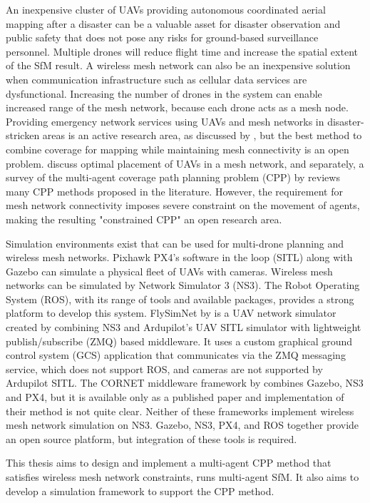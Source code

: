 An inexpensive cluster of UAVs providing autonomous coordinated aerial mapping after a disaster can be a valuable asset for disaster observation and public safety that does not pose any risks for ground-based surveillance personnel. Multiple drones will reduce flight time and increase the spatial extent of the SfM result. A wireless mesh network can also be an inexpensive solution when communication infrastructure such as cellular data services are dysfunctional. Increasing the number of drones in the system can enable increased range of the mesh network, because each drone acts as a mesh node. Providing emergency network services using UAVs and mesh networks in disaster-stricken areas is an active research area, as discussed by , but the best method to combine coverage for mapping while maintaining mesh connectivity is an open problem.  discuss optimal placement of UAVs in a mesh network, and separately, a survey of the multi-agent coverage path planning problem (CPP) by  reviews many CPP methods proposed in the literature. However, the requirement for mesh network connectivity imposes severe constraint on the movement of agents, making the resulting "constrained CPP" an open research area.

Simulation environments exist that can be used for multi-drone planning and wireless mesh networks. Pixhawk PX4's software in the loop (SITL) along with Gazebo can simulate a physical fleet of UAVs with cameras. Wireless mesh networks can be simulated by Network Simulator 3 (NS3). The Robot Operating System (ROS), with its range of tools and available packages, provides a strong platform to develop this system. FlySimNet by  is a UAV network simulator created by combining NS3 and Ardupilot's UAV SITL simulator with lightweight publish/subscribe (ZMQ) based middleware. It uses a custom graphical ground control system (GCS) application that communicates via the ZMQ messaging service, which does not support ROS, and cameras are not supported by Ardupilot SITL. The CORNET middleware framework by  combines Gazebo, NS3 and PX4, but it is available only as a published paper and implementation of their method is not quite clear. Neither of these frameworks implement wireless mesh network simulation on NS3. Gazebo, NS3, PX4, and ROS together provide an open source platform, but integration of these tools is required.

This thesis aims to design and implement a multi-agent CPP method that satisfies wireless mesh network constraints, runs multi-agent SfM. It also aims to develop a simulation framework to support the CPP method.

